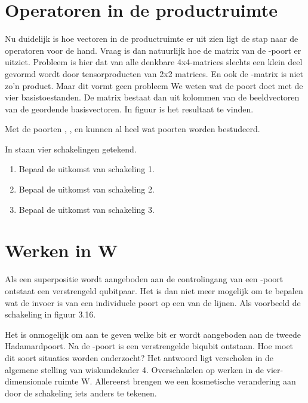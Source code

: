 \documentclass[../main.tex]{subfiles}
\begin{document}
\section{Operatoren in de productruimte}
Nu duidelijk is hoe vectoren in de productruimte er uit zien ligt de stap naar de operatoren voor de hand. Vraag is dan natuurlijk hoe de matrix van de -poort er uitziet. Probleem is hier dat van alle denkbare 4x4-matrices slechts een klein deel gevormd wordt door tensorproducten van 2x2 matrices. En ook de -matrix is niet zo'n product. 
Maar dit vormt geen probleem 
We weten wat de poort doet met de vier basistoestanden. De matrix bestaat dan uit kolommen van de beeldvectoren van de geordende basisvectoren. In figuur  is het resultaat te vinden.


Met de poorten , ,  en  kunnen al heel wat poorten worden bestudeerd.

In  staan vier schakelingen getekend. 


\begin{antwoord}
\end{antwoord}
\begin{opdracht}
\begin{enumerate}
\item Bepaal de uitkomst van schakeling 1.
\item Bepaal de uitkomst van schakeling 2. 
\item Bepaal de uitkomst van schakeling 3.
\end{enumerate}
\end{opdracht}

\section{Werken in W}
Als een superpositie wordt aangeboden aan de controlingang van een -poort ontstaat een verstrengeld qubitpaar. Het is dan niet meer mogelijk om te bepalen wat de invoer is van een individuele poort op een van de lijnen. 
Als voorbeeld de schakeling in figuur 3.16.

Het is onmogelijk om aan te geven welke bit er wordt aangeboden aan de tweede Hadamardpoort. Na de -poort is een verstrengelde biqubit ontstaan. Hoe moet dit soort situaties worden onderzocht?
Het antwoord ligt verscholen in de algemene stelling van wiskundekader 4. Overschakelen op werken in de vier-dimensionale ruimte W. Allereerst brengen we een kosmetische verandering aan door de schakeling iets anders te tekenen.
\end{document}
